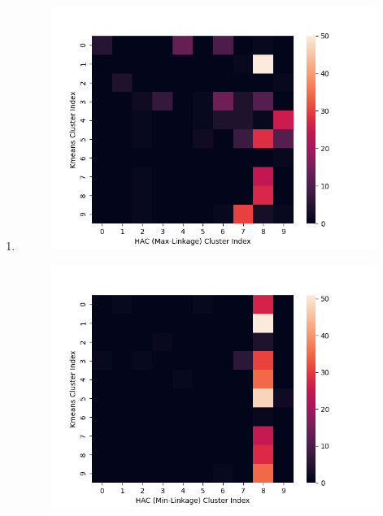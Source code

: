 \documentclass[submit]{harvardml}
\begin{document}
\begin{enumerate}
    \newpage
    \item
        \begin{figure}[h!]
            \centering
            \includegraphics[height=0.4\textheight]{HW4/heatmap1.png}
        \end{figure}
    \begin{figure}[h!]
            \centering
            \includegraphics[height=0.4\textheight]{HW4/heatmap2.png}
        \end{figure}
    \begin{figure}[h!]
            \centering

\end{figure}
\end{enumerate}
\end{document}
